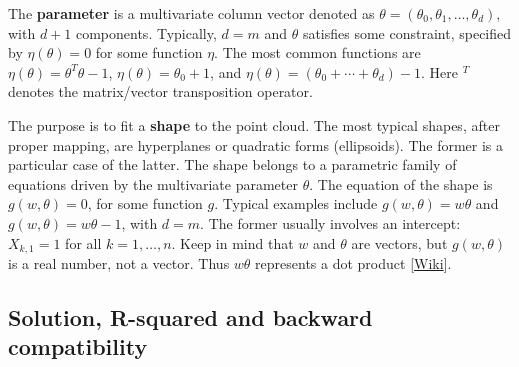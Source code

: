\documentclass[oneside,10pt]{book}
\begin{document}
The {\bf parameter} is a multivariate
 column vector denoted as $\theta=(\theta_0,\theta_1,\dots,\theta_d)$, with $d+1$ components. Typically, $d=m$ and $\theta$ satisfies some  constraint, specified by $\eta(\theta)=0$
 for some function $\eta$. The most common functions are $\eta(\theta)=\theta^T\theta-1$, $\eta(\theta)=\theta_0+1$, and
  $\eta(\theta)=(\theta_0+\cdots + \theta_d) - 1$. Here $^T$ denotes the matrix/vector transposition operator.

The purpose is to fit a {\bf shape} to the point cloud. The most typical shapes, after proper mapping, are hyperplanes or quadratic forms (ellipsoids). The
 former is a particular case of the latter. The shape belongs to a parametric family of equations driven by the multivariate parameter $\theta$. The equation of the shape is $g(w,\theta)=0$, for some function $g$. Typical examples include $g(w,\theta)=w\theta$ and $g(w,\theta)=w\theta-1$, with $d=m$.
The former usually involves an intercept: $X_{k,1}=1$ for all $k=1,\dots,n$. Keep in mind that $w$ and $\theta$ are vectors, but $g(w,\theta)$ is a real number, not a vector. Thus $w\theta$ represents a \textcolor{index}{dot product} [\href{https://en.wikipedia.org/wiki/Dot_product}{Wiki}].

\subsection{Solution, R-squared and backward compatibility}
\end{document}
